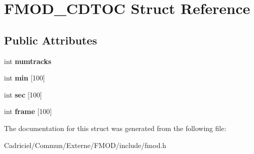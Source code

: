 \hypertarget{struct_f_m_o_d___c_d_t_o_c}{\section{F\-M\-O\-D\-\_\-\-C\-D\-T\-O\-C Struct Reference}
\label{struct_f_m_o_d___c_d_t_o_c}
}
\subsection*{Public Attributes}
\begin{DoxyCompactItemize}
\item 
\hypertarget{struct_f_m_o_d___c_d_t_o_c_aad0a3526919d1d67958c47179a73cf7b}{int {\bfseries numtracks}}\label{struct_f_m_o_d___c_d_t_o_c_aad0a3526919d1d67958c47179a73cf7b}

\item 
\hypertarget{struct_f_m_o_d___c_d_t_o_c_ac32672636e86e7d5da6cd02737123f0e}{int {\bfseries min} \mbox{[}100\mbox{]}}\label{struct_f_m_o_d___c_d_t_o_c_ac32672636e86e7d5da6cd02737123f0e}

\item 
\hypertarget{struct_f_m_o_d___c_d_t_o_c_a20dcf991841f7f4322904f9a1175e7c6}{int {\bfseries sec} \mbox{[}100\mbox{]}}\label{struct_f_m_o_d___c_d_t_o_c_a20dcf991841f7f4322904f9a1175e7c6}

\item 
\hypertarget{struct_f_m_o_d___c_d_t_o_c_a40e8bdc25c765a02c4ca0af13c74dc5f}{int {\bfseries frame} \mbox{[}100\mbox{]}}\label{struct_f_m_o_d___c_d_t_o_c_a40e8bdc25c765a02c4ca0af13c74dc5f}

\end{DoxyCompactItemize}


The documentation for this struct was generated from the following file\-:\begin{DoxyCompactItemize}
\item 
Cadriciel/\-Commun/\-Externe/\-F\-M\-O\-D/include/fmod.\-h\end{DoxyCompactItemize}
